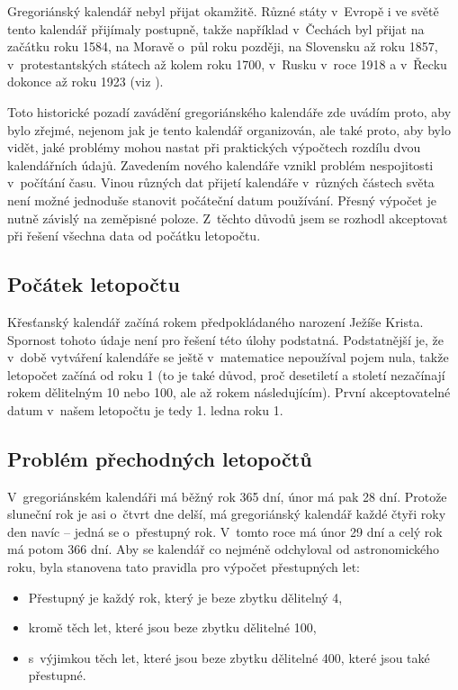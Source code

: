 \documentclass[12pt,a4paper,titlepage,final]{article}
\begin{document}
Gregoriánský kalendář nebyl přijat okamžitě. Různé státy v~Evropě i ve světě
tento kalendář přijímaly postupně, takže například v~Čechách byl přijat na
začátku roku 1584, na Moravě o~půl roku později, na Slovensku až roku 1857,
v~protestantských státech až kolem roku 1700, v~Rusku v~roce 1918 a v~Řecku
dokonce až roku 1923 (viz \cite{kalendar}).

Toto historické pozadí zavádění gregoriánského kalendáře zde uvádím proto, aby
bylo zřej\-mé, nejenom jak je tento kalendář organizován, ale také proto, aby
bylo vidět, jaké problémy mohou nastat při praktických výpočtech rozdílu dvou
kalendářních údajů. Zavedením nového kalendáře vznikl problém nespojitosti
v~počítání času. Vinou různých dat přijetí kalendáře v~různých částech světa
není možné jednoduše stanovit počáteční datum používání. Přesný výpočet je
nutně závislý na zeměpisné poloze. Z~těchto důvodů jsem se rozhodl akceptovat
při řešení všechna data od počátku letopočtu.

\subsection{Počátek letopočtu}

Křesťanský kalendář začíná rokem předpokládaného narození Ježíše Krista.
Spornost tohoto údaje není pro řešení této úlohy podstatná. Podstatnější je, že
v~době vytváření kalendáře se ještě v~matematice nepoužíval pojem nula, takže
letopočet začíná od roku 1 (to je také důvod, proč desetiletí a století
nezačínají rokem dělitelným 10 nebo 100, ale až rokem následujícím). První
akceptovatelné datum v~našem letopočtu je tedy 1. ledna roku 1.

\subsection{Problém přechodných letopočtů}

V~gregoriánském kalendáři má běžný rok 365 dní, únor má pak 28 dní. Protože
sluneční rok je asi o~čtvrt dne delší, má gregoriánský kalendář každé čtyři
roky den navíc -- jedná se o~přestupný rok. V~tomto roce má únor 29 dní a celý
rok má potom 366 dní. Aby se kalendář co nejméně odchyloval od astronomického
roku, byla stanovena tato pravidla pro výpočet přestupných let: \begin{itemize}
\item Přestupný je každý rok, který je beze zbytku dělitelný 4, \item kromě
těch let, které jsou beze zbytku dělitelné 100, \item s~výjimkou těch let,
které jsou beze zbytku dělitelné 400, které jsou také přestupné.  \end{itemize} 
\end{document}
